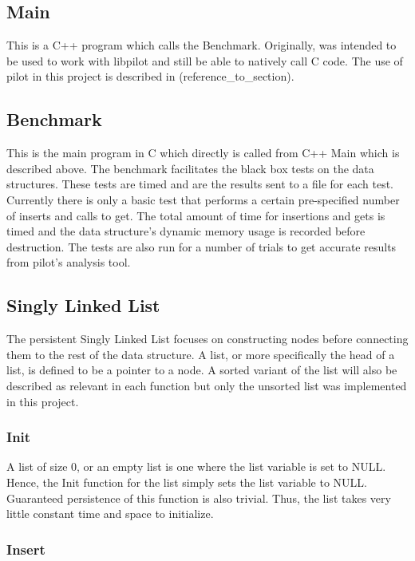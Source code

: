 \documentclass[twocolumn]{article}
\begin{document}
\subsection{Main}

This is a C++ program which calls the Benchmark. Originally, was intended to be
used to work with libpilot and still be able to natively call C code. The use of
pilot in this project is described in (reference\_to\_section).

\subsection{Benchmark}

This is the main program in C which directly is called from C++ Main which is
described above. The benchmark facilitates the black box tests on the data
structures. These tests are timed and are the results sent to a file for each
test. Currently there is only a basic test that performs a certain pre-specified
number of inserts and calls to get. The total amount of time for insertions and
gets is timed and the data structure's dynamic memory usage is recorded before
destruction. The tests are also run for a number of trials to get accurate
results from pilot's analysis tool.

\subsection{Singly Linked List}

The persistent Singly Linked List focuses on constructing nodes before
connecting them to the rest of the data structure. A list, or more specifically
the head of a list, is defined to be a pointer to a node. A sorted variant of
the list will also be described as relevant in each function but only the
unsorted list was implemented in this project.

\subsubsection{Init}

A list of size 0, or an empty list is one where the list variable is set to
NULL. Hence, the Init function for the list simply sets the list variable to
NULL. Guaranteed persistence of this function is also trivial. Thus, the list
takes very little constant time and space to initialize.

\subsubsection{Insert}
\end{document}
